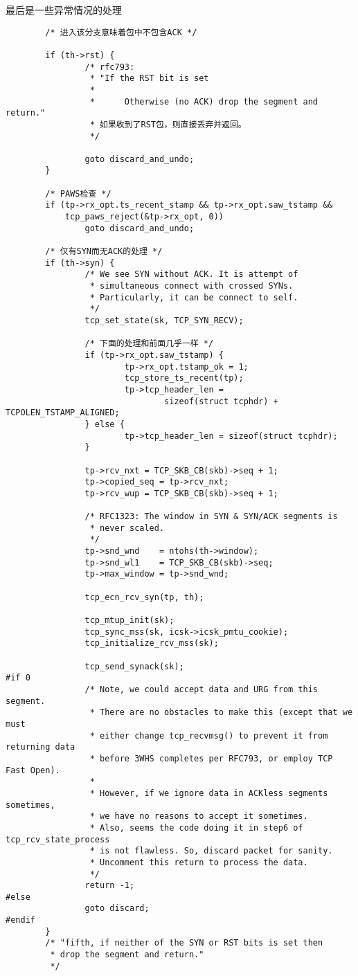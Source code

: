 最后是一些异常情况的处理
\begin{verbatim}
        /* 进入该分支意味着包中不包含ACK */

        if (th->rst) {
                /* rfc793:
                 * "If the RST bit is set
                 *
                 *      Otherwise (no ACK) drop the segment and return."
                 * 如果收到了RST包，则直接丢弃并返回。
                 */

                goto discard_and_undo;
        }

        /* PAWS检查 */
        if (tp->rx_opt.ts_recent_stamp && tp->rx_opt.saw_tstamp &&
            tcp_paws_reject(&tp->rx_opt, 0))
                goto discard_and_undo;

        /* 仅有SYN而无ACK的处理 */
        if (th->syn) {
                /* We see SYN without ACK. It is attempt of
                 * simultaneous connect with crossed SYNs.
                 * Particularly, it can be connect to self.
                 */
                tcp_set_state(sk, TCP_SYN_RECV);

                /* 下面的处理和前面几乎一样 */
                if (tp->rx_opt.saw_tstamp) {
                        tp->rx_opt.tstamp_ok = 1;
                        tcp_store_ts_recent(tp);
                        tp->tcp_header_len =
                                sizeof(struct tcphdr) + TCPOLEN_TSTAMP_ALIGNED;
                } else {
                        tp->tcp_header_len = sizeof(struct tcphdr);
                }

                tp->rcv_nxt = TCP_SKB_CB(skb)->seq + 1;
                tp->copied_seq = tp->rcv_nxt;
                tp->rcv_wup = TCP_SKB_CB(skb)->seq + 1;

                /* RFC1323: The window in SYN & SYN/ACK segments is
                 * never scaled.
                 */
                tp->snd_wnd    = ntohs(th->window);
                tp->snd_wl1    = TCP_SKB_CB(skb)->seq;
                tp->max_window = tp->snd_wnd;

                tcp_ecn_rcv_syn(tp, th);

                tcp_mtup_init(sk);
                tcp_sync_mss(sk, icsk->icsk_pmtu_cookie);
                tcp_initialize_rcv_mss(sk);

                tcp_send_synack(sk);
#if 0
                /* Note, we could accept data and URG from this segment.
                 * There are no obstacles to make this (except that we must
                 * either change tcp_recvmsg() to prevent it from returning data
                 * before 3WHS completes per RFC793, or employ TCP Fast Open).
                 *
                 * However, if we ignore data in ACKless segments sometimes,
                 * we have no reasons to accept it sometimes.
                 * Also, seems the code doing it in step6 of tcp_rcv_state_process
                 * is not flawless. So, discard packet for sanity.
                 * Uncomment this return to process the data.
                 */
                return -1;
#else
                goto discard;
#endif
        }
        /* "fifth, if neither of the SYN or RST bits is set then
         * drop the segment and return."
         */


\end{verbatim}
